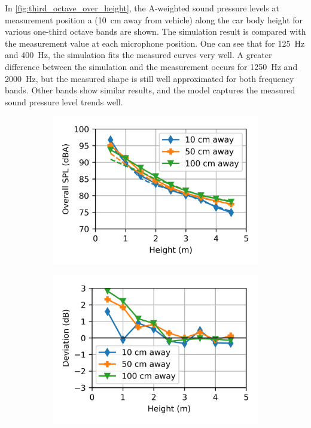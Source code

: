 In \cref{fig:third_octave_over_height}, the A-weighted sound pressure levels at measurement position a (\SI{10}{\centi\meter} away from vehicle) along the car body height for various one-third octave bands are shown. The simulation result is compared with the measurement value at each microphone position. One can see that for \SI{125}{\hertz} and \SI{400}{\hertz}, the simulation fits the measured curves very well. A greater difference between the simulation and the measurement occurs for \SI{1250}{\hertz} and \SI{2000}{\hertz}, but the measured shape is still well approximated for both frequency bands. Other bands show similar results, and the model captures the measured sound pressure level trends well.

\begin{figure}%
	\centering
	\begin{subfigure}[b]{0.49\textwidth}
		\centering
		\includegraphics{fig/chap5/initial_model/overall_SPL/all_pos.png}
	\end{subfigure}
	\hfill
	\begin{subfigure}[b]{0.49\textwidth}
		\centering
		\includegraphics{fig/chap5/initial_model/overall_SPL/deviation.png}

\end{subfigure}
\end{figure}
